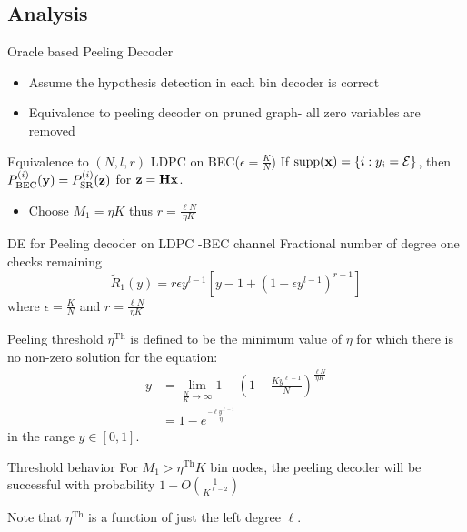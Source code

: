 \subsection{Analysis}
\begin{frame}{Oracle based Peeling Decoder}
\begin{itemize}
\item Assume the hypothesis detection in each bin decoder is correct
\item Equivalence to peeling decoder on pruned graph- all zero variables are removed
\end{itemize}
\begin{block}{Equivalence to $(N,l,r)$ LDPC on BEC($\epsilon=\frac{K}{N}$)}
If $\text{supp}(\mathbf{x})=\{i:y_i=\mathcal{E}\}$, then $P^{(i)}_{\text{BEC}}(\mathbf{y})=P^{(i)}_{\text{SR}}(\mathbf{z})$  for $\mathbf{z=Hx}$.
\end{block}
\begin{itemize}
\item Choose $M_1=\eta K$ thus $r=\frac{\ell N}{\eta K}$
\end{itemize}
\vspace{1ex}
\begin{block}{DE for Peeling decoder on LDPC -BEC channel}
Fractional number of degree one checks remaining
\begin{equation*}
\tilde{R}_1(y)=r\epsilon y^{l-1}[y-1+(1-\epsilon y^{l-1})^{r-1}]
\end{equation*}
where $\epsilon=\frac{K}{N}$ and $r=\frac{\ell N}{\eta K}$
\end{block}
\end{frame}

\begin{frame}{}
\begin{block}{Peeling threshold}
$\eta^{\text{Th}}$ is defined to be the minimum value of $\eta$ for which there is no non-zero solution for the equation:
\begin{align*}
y&=\lim_{\frac{N}{K}\rightarrow\infty}1-\left(1-\frac{Ky^{\ell-1}}{N}\right)^{\frac{\ell N}{\eta K}}\\
  &=1-e^{\frac{-\ell y^{\ell-1}}{\eta}}
\end{align*}
in the range $y\in [0,1]$.
\end{block}
\vspace{3ex}
\begin{block}{Threshold behavior}
For $M_1>\eta^{\text{Th}}K$ bin nodes, the peeling decoder will be successful with probability $1-O\left(\frac{1}{K^{\ell-2}}\right)$
\end{block}
Note that $\eta^{\text{Th}}$ is a function of just the left degree $\ell$.
\end{frame}

